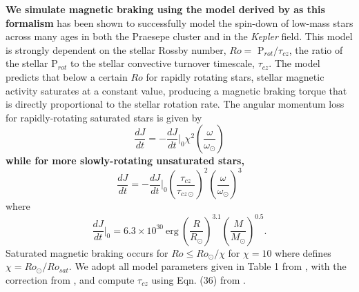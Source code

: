 \documentclass[twocolumn]{aastex61}
\newcommand{\xxx}[1]{{\textbf{#1}}}
\newcommand{\kepler}[0]{\textit{Kepler}\xspace}
\begin{document}
\xxx{We simulate magnetic braking using the model derived by \citet{Matt2015} as this formalism} has been shown to successfully model the spin-down of low-mass stars across many ages in both the Praesepe cluster and in the \kepler field. This model is strongly dependent on the stellar Rossby number, $Ro = $ P$_{rot}/\tau_{cz}$, the ratio of the stellar P$_{rot}$ to the stellar convective turnover timescale, $\tau_{cz}$. The \citet{Matt2015} model predicts that below a certain $Ro$ for rapidly rotating stars, stellar magnetic activity saturates at a constant value, producing a magnetic braking torque that is directly proportional to the stellar rotation rate.  The angular momentum loss for rapidly-rotating saturated stars is given by
\begin{equation} \label{eqn:mattSat}
\frac{dJ}{dt} = -\frac{dJ}{dt}\Bigg|_0 \chi^2 \left( \frac{\omega}{\omega_{\odot}} \right) 
\end{equation}
\xxx{while for more slowly-rotating unsaturated stars,}
\begin{equation} \label{eqn:mattUnSat}
\frac{dJ}{dt} = -\frac{dJ}{dt}\Bigg|_0 \left( \frac{\tau_{cz}}{\tau_{cz \odot}} \right)^2 \left( \frac{\omega}{\omega_{\odot}} \right)^3
\end{equation}
where
\begin{equation} \label{eqn:matt0}
\frac{dJ}{dt}\Bigg|_0 = 6.3 \times 10^{30} \ \mathrm{erg} \ \left( \frac{R}{R_{\odot}} \right)^{3.1} \left( \frac{M}{M_{\odot}} \right)^{0.5}.
\end{equation}
Saturated magnetic braking occurs for $Ro \leq Ro_{\odot}/\chi$ for $\chi = 10$ where \citet{Matt2015} defines $\chi = Ro_{\odot}/Ro_{sat}$.  We adopt all model parameters given in Table 1 from \citet{Matt2015}, with the correction from \citet{Matt2019}, and compute $\tau_{cz}$ using Eqn. (36) from \citet{Cranmer2011}.

\end{document}
